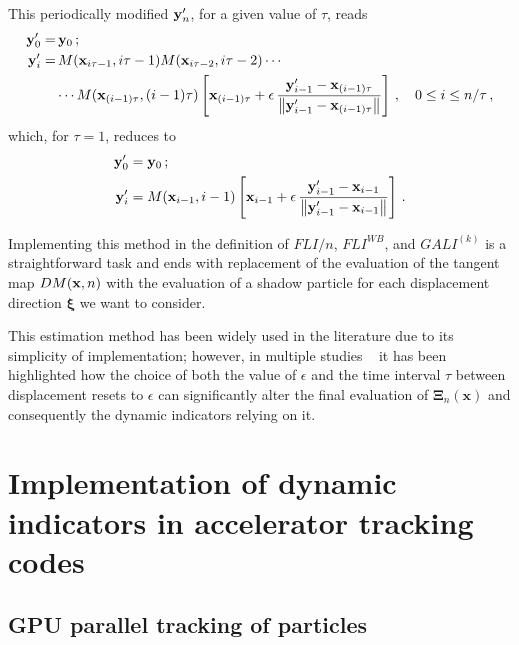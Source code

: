 This periodically modified $\vb{y}'_n$, for a given value of $\tau$, reads
\begin{equation}
    \begin{aligned}
        \vb{y}'_0 =&\, \vb{y}_0 \,;  \\
        \vb{y}'_i =&\, M(\vb{x}_{i\tau - 1}, i\tau - 1)M(\vb{x}_{i\tau - 2}, i\tau - 2)\cdots \\
        &\cdots M(\vb{x}_{(i-1)\tau}, (i-1)\tau)\left[\vb{x}_{(i-1)\tau}+\epsilon\,\frac{\vb{y}'_{i-1}-\vb{x}_{(i-1)\tau}}{\norm{\vb{y}'_{i-1}-\vb{x}_{(i-1)\tau}}}\right]\,, \quad 0 \leq i \leq n/\tau \,,        
    \end{aligned}
\end{equation}
which, for $\tau=1$, reduces to
\begin{equation}
\begin{aligned}
    \vb{y}'_0 &= \vb{y}_0 \,; \\
    \vb{y}'_i &= M(\vb{x}_{i-1}, i-1)\left[\vb{x}_{i-1}+\epsilon\,\frac{\vb{y}'_{i-1}-\vb{x}_{i-1}}{\norm{\vb{y}'_{i-1}-\vb{x}_{i-1}}}\right]\,.
\end{aligned}
\end{equation}

Implementing this method in the definition of $FLI/n$, $FLI^{WB}$, and $GALI^{(k)}$ is a straightforward task and ends with replacement of the evaluation of the tangent map $DM(\vb{x}, n)$ with the evaluation of a shadow particle for each displacement direction $\boldsymbol{\xi}$ we want to consider.

This estimation method has been widely used in the literature due to its simplicity of implementation; however, in multiple studies ~\cite{Tancredi_2001, Skokos2010b} it has been highlighted how the choice of both the value of $\epsilon$ and the time interval $\tau$ between displacement resets to $\epsilon$ can significantly alter the final evaluation of $\boldsymbol{\Xi}_{n}(\mathbf{x})$ and consequently the dynamic indicators relying on it.


\section{Implementation of dynamic indicators in accelerator tracking codes} \label{sec:8:implement}
%

\subsection{GPU parallel tracking of particles}

